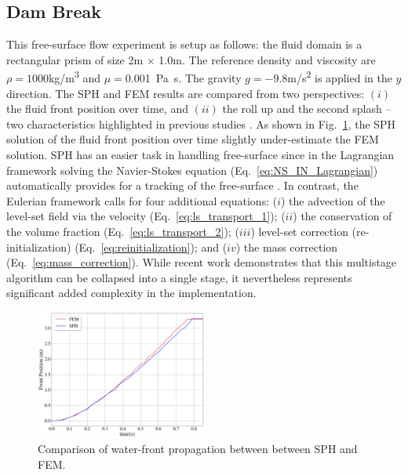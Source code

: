 \subsection{Dam Break}
This free-surface flow experiment is setup as follows: the fluid domain is a rectangular prism of size 2\si{m} $\times$ 1.0\si{m}. The reference density and viscosity are $\rho=1000$\si{kg/m^3} and $\mu=$\SI{0.001}{Pa.s}. The gravity $g=-9.8$\si{m/s^2} is applied in the  $y$ direction. The SPH and FEM results are compared from two perspectives: $(i)$ the fluid front position over time, and $(ii)$ the roll up and the second splash -- two characteristics highlighted in previous studies \cite{colagrossi2003numerical,Adami2012}. As shown in Fig.~\ref{fig:db_front_fsi}, the SPH solution of the fluid front position over time slightly under-estimate the FEM solution. SPH has an easier task in handling free-surface since in the Lagrangian framework solving the Navier-Stokes equation (Eq.~\ref{eq:NS_IN_Lagrangian}) automatically provides for a tracking of the free-surface  \cite{Martin1952,colagrossi2003numerical,hughes2010comparison,xu2016improved,miladHalfImplicit2018}. In contrast, the Eulerian framework calls for four additional equations: ($i$) the advection of the level-set field via the velocity (Eq.~\ref{eq:ls_transport_1}); ($ii$) the conservation of the volume fraction (Eq.~\ref{eq:ls_transport_2}); ($iii$) level-set correction (re-initialization) (Eq.~\ref{eq:reinitialization}); and ($iv$) the mass correction (Eq.~\ref{eq:mass_correction}). While recent work \cite{quezadadeluna2019monolithic} demonstrates that this multistage algorithm can be collapsed into a single stage, it nevertheless represents significant added complexity in the implementation.
\begin{figure}[H]
	\begin{center}
		\includegraphics[width=0.5\textwidth]{images/FSI_Comparison/Figure_damBreak.png}
	\end{center}
	\caption{Comparison of water-front propagation between between SPH and FEM.}
	\label{fig:db_front_fsi}
\end{figure}
